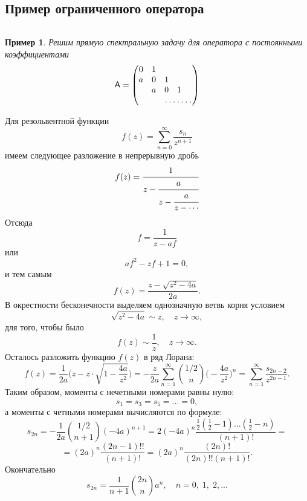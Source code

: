 \documentclass[12pt,a4paper]{article}
\theoremstyle{plain}   \newtheorem{Pro}{Задача}
\newtheorem{Exa}{Пример}
\begin{document}
\subsection{Пример ограниченного оператора}
$ \; $
\\
\begin{Exa}
Решим прямую спектральную задачу для оператора с постоянными
коэффициентами
\begin{equation*}
  \mathsf{A}=
    \begin{pmatrix}
	  0 & 1 & \; & \; & \; \\
	  a & 0 & 1 & \; & \; \\
	  \; & a & 0 & 1 & \; \\
	  \; & \; & \hdotsfor{3}
	\end{pmatrix}
\end{equation*}
\end{Exa}
Для резольвентной функции
\begin{equation*}
  f(z)= \sum _{n=0}^{\infty}
  \frac{s_n}{z^{n+1}}
\end{equation*}
имеем следующее разложение в непрерывную дробь
\begin{equation*}
  f(z)=
    \cfrac{1}{z-
	 \cfrac{a}{z-
	  \cfrac{a}{z- \dotsb
	   }}}
\end{equation*}
Отсюда
$$
  f=\frac{1}{z-af}
$$
или
$$
  af^2 -zf+1=0,
$$
и тем самым
$$
  f(z)=\frac{z-\sqrt{z^2 -4a}}{2a}.
$$
В окрестности бесконечности выделяем однозначную ветвь
корня условием
$$
  \sqrt{z^2 -4a} \sim z, \quad z \rightarrow \infty ,
$$
для того, чтобы было
$$
  f(z) \sim \frac{1}{z}, \quad z \rightarrow \infty .
$$
Осталось разложить функцию
$ f(z) $
в ряд Лорана:
\begin{equation*}
  f(z)=\frac{1}{2a} \Biggl ( z-
  z \cdot \sqrt{1- \frac{4a}{z^2}} \Biggr ) =
  -\frac{z}{2a} \sum _{n=1}^{\infty}
  \binom{1/2}{n}\biggl (-\frac{4a}{z^2} \biggr ) ^n =
  \sum _{n=1}^{\infty} \frac{s_{2n-2}}{z^{2n-1}}.
\end{equation*}
Таким образом, моменты с нечетными номерами равны нулю:
$$
  s_1 =s_3 =s_5 =...=0,
$$
а моменты с четными номерами вычисляются по формуле:
$$
  s_{2n}=-\frac{1}{2a} \binom{1/2}{n+1}(-4a)^{n+1}=
  2(-4a)^n \frac{\frac{1}{2}(\frac{1}{2}-1)...(\frac{1}{2}-n)}
  {(n+1)!}=
$$
$$
  = (2a)^n \frac{(2n-1)!!}{(n+1)!}=
  (2a)^n \frac{(2n)!}{(2n)!!(n+1)!}.
$$
Окончательно
$$
  s_{2n}=\frac{1}{n+1} \binom{2n}{n} a^n ,
  \quad n=0, \; 1, \; 2,...
$$
\\
\end{document}
